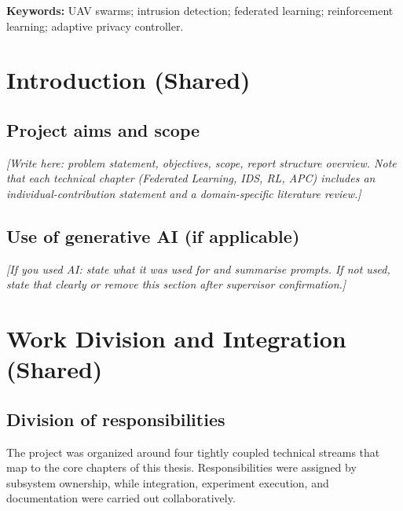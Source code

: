 \documentclass[11pt,a4paper,oneside]{report}
\begin{document}
\vspace{0.75em}
\noindent\textbf{Keywords:} UAV swarms; intrusion detection; federated learning; reinforcement learning; adaptive privacy controller.

\tableofcontents

\chapter{Introduction (Shared)}
\label{ch:intro}

\section{Project aims and scope}
\textit{[Write here: problem statement, objectives, scope, report structure overview. Note that each technical chapter (Federated Learning, IDS, RL, APC) includes an individual-contribution statement and a domain-specific literature review.]}

\section{Use of generative AI (if applicable)}
\textit{[If you used AI: state what it was used for and summarise prompts. If not used, state that clearly or remove this section after supervisor confirmation.]}

\chapter{Work Division and Integration (Shared)}
\label{ch:division}

\section{Division of responsibilities}
The project was organized around four tightly coupled technical streams that map to the core chapters of this thesis. Responsibilities were assigned by subsystem ownership, while integration, experiment execution, and documentation were carried out collaboratively.
\end{document}
